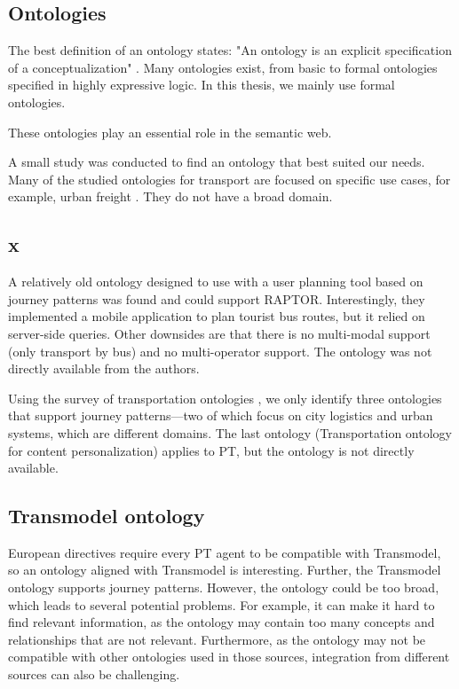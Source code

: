 \subsection{Ontologies}
The best definition of an ontology states: "An ontology is an explicit specification of a conceptualization" \cite{gruber_translation_1993}. Many ontologies exist, from basic to formal ontologies specified in highly expressive logic. In this thesis, we mainly use formal ontologies.

These ontologies play an essential role in the semantic web. 

A small study was conducted to find an ontology that best suited our needs. Many of the studied ontologies for transport are focused on specific use cases, for example, urban freight \cite{bouhana_ontology-based_2015}. They do not have a broad domain. 
\subsection{x}
A relatively old ontology designed to use with a user planning tool based on journey patterns \cite{5507372} was found and could support RAPTOR. Interestingly, they implemented a mobile application to plan tourist bus routes, but it relied on server-side queries. Other downsides are that there is no multi-modal support (only transport by bus) and no multi-operator support. The ontology was not directly available from the authors.

Using the survey of transportation ontologies \cite{katsumi_ontologies_2018}, we only identify three ontologies that support journey patterns—two of which focus on city logistics and urban systems, which are different domains. The last ontology (Transportation ontology for content personalization) applies to PT, but the ontology is not directly available.

\subsection{Transmodel ontology}
European directives require every PT agent to be compatible with Transmodel, so an ontology aligned with Transmodel is interesting. Further, the Transmodel ontology supports journey patterns. However, the ontology could be too broad, which leads to several potential problems. For example, it can make it hard to find relevant information, as the ontology may contain too many concepts and relationships that are not relevant. Furthermore, as the ontology may not be compatible with other ontologies used in those sources, integration from different sources can also be challenging.

